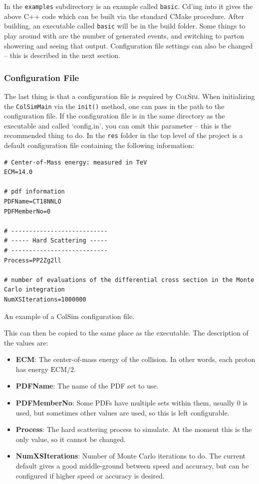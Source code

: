 In the \texttt{examples} subdirectory is an example called \texttt{basic}. Cd'ing into it gives the above C++ code which can be built via the standard CMake procedure. After building, an executable called \texttt{basic} will be in the build folder. Some things to play around with are the number of generated events, and switching to parton showering and seeing that output. Configuration file settings can also be changed -- this is described in the next section.

\subsubsection{Configuration File}

The last thing is that a configuration file is required by \textsc{ColSim}. When initializing the \texttt{ColSimMain} via the \texttt{init()} method, one can pass in the path to the configuration file. If the configuration file is in the same directory as the executable and called `config.in', you can omit this parameter -- this is the recommended thing to do. In the \texttt{res} folder in the top level of the project is a default configuration file containing the following information:

\begin{listing}[!ht]
  \begin{verbatim}
# Center-of-Mass energy: measured in TeV
ECM=14.0

# pdf information
PDFName=CT18NNLO
PDFMemberNo=0

# ---------------------------
# ----- Hard Scattering -----
# ---------------------------
Process=PP2Zg2ll

# number of evaluations of the differential cross section in the Monte Carlo integration
NumXSIterations=1000000
  \end{verbatim}
  \caption{An example of a ColSim configuration file.}
  \label{listing:colsim-config-file}
\end{listing}

This can then be copied to the same place as the executable. The description of the values are:

\begin{itemize}
\item \textbf{ECM}: The center-of-mass energy of the collision. In other words, each proton has energy $\mathrm{ECM}/2$.
\item \textbf{PDFName}: The name of the PDF set to use.
\item \textbf{PDFMemberNo}: Some PDFs have multiple sets within them, usually 0 is used, but sometimes other values are used, so this is left configurable.
\item \textbf{Process}: The hard scattering process to simulate. At the moment this is the only value, so it cannot be changed.
\item \textbf{NumXSIterations}: Number of Monte Carlo iterations to do. The current default gives a good middle-ground between speed and accuracy, but can be configured if higher speed or accuracy is desired.
\end{itemize}

